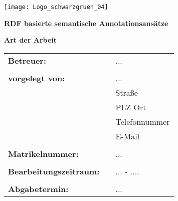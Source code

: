 \documentclass[12pt,
				a4paper,
				twoside=false,
				titlepage=true,
				bibliography=totoc, %
				listof=totoc, %
				numbers=noenddot]{scrartcl}
\begin{document}

\begin{titlepage}
\begin{minipage}{1\textwidth}
\flushright 
   \texttt{[image: Logo\_schwarzgruen\_04]}
\end{minipage}

\vspace{3cm}
\begin{center}
\textbf{\LARGE{RDF basierte semantische Annotationsansätze}}
\\
\end{center}
\vspace{1.5cm}

\begin{center}
\textbf{Art der Arbeit}
\end{center}

\vspace{3.5cm}

\begin{flushleft}
\begin{tabular}{lll}
\textbf{Betreuer:} & &  ...\\
& & \\
\textbf{vorgelegt von:}& & ...\\
& & Straße\\
& & PLZ Ort\\
& & Telefonnummer\\
& & E-Mail\\
& & \\
\textbf{Matrikelnummer:} & & ...\\
& & \\

\textbf{Bearbeitungszeitraum:} & & ... - ....\\
& & \\

\textbf{Abgabetermin:} & & ...
\end{tabular}
\end{flushleft}
\end{titlepage}


\setcounter{page}{2}
\newpage
\tableofcontents %
\newpage
\listoffigures %
\newpage 
\listoftables %
\newpage
\listofformels %
\newpage
\newpage








\setcounter{page}{9}

\printbibliography[heading=head]


\end{document}
